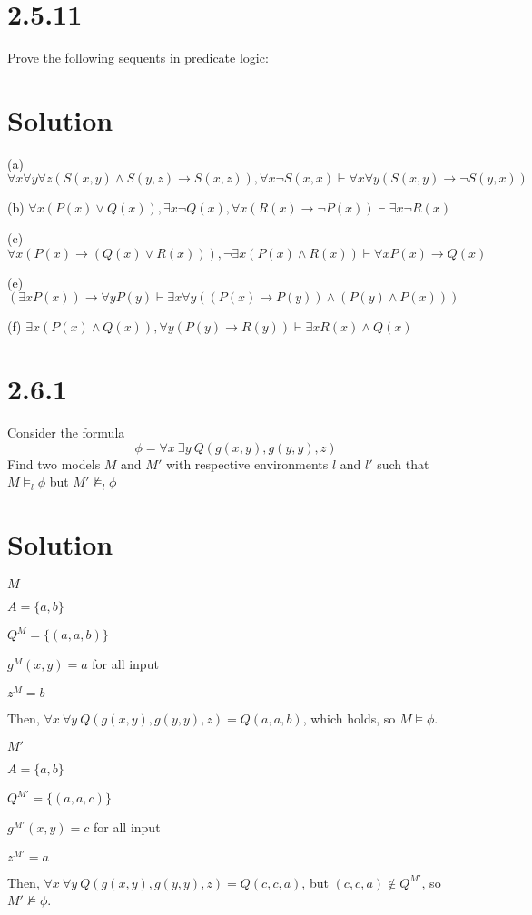 \documentclass[10pt]{article}
\begin{document}
\section*{2.5.11}
Prove the following sequents in predicate logic:
\section*{Solution}
\begin{description*}
\item[(a)] $\forall x \forall y \forall z (S(x,y) \land S(y,z)\to S(x,z)), \forall x \lnot S(x,x) \vdash \forall x \forall y (S(x,y)\to \lnot S(y,x))$
\item[(b)] $\forall x (P(x) \lor Q(x)), \exists x\lnot Q(x), \forall x(R(x) \to \lnot P(x)) \vdash \exists x \lnot R(x)$
\item[(c)] $\forall x (P(x) \to (Q(x)\lor R(x))), \lnot \exists x(P(x)\land R(x))\vdash \forall xP(x)\to Q(x)$
\item[(e)] $ (\exists x P(x))\to \forall y P(y)\vdash \exists x \forall y ((P(x)\to P(y))\land (P(y)\land P(x))) $
\item[(f)] $ \exists x (P(x)\land Q(x)), \forall y(P(y)\to R(y)) \vdash \exists x R(x) \land Q(x) $
\end{description*}

\section*{2.6.1}
Consider the formula
\[
\phi = \forall x\ \exists y\ Q(g(x,y),g(y,y),z)
\]
Find two models $M$ and $M'$ with respective environments $l$ and $l'$ such that $M \models_{l} \phi$ but $M' \not \models_{l} \phi$
\section*{Solution}
\begin{description*}
\item $M$
\item $A = \{a,b\}$
\item $Q^{M} = \{(a,a,b)\}$
\item $g^{M}(x,y) = a$ for all input
\item $z^{M} = b$
\end{description*}
Then, $\forall x\ \forall y\ Q(g(x,y),g(y,y),z)=Q(a,a,b)$, which holds, so $M \models \phi$.
\begin{description*}
\item $M'$
\item $A = \{a,b\}$
\item $Q^{M'} = \{(a,a,c)\}$
\item $g^{M'}(x,y) = c$ for all input
\item $z^{M'} = a$
\end{description*}
Then, $\forall x\ \forall y\ Q(g(x,y),g(y,y),z) = Q(c,c,a)$, but $(c,c,a) \not \in Q^{M'}$, so $M' \not \models \phi$.
\end{document}
